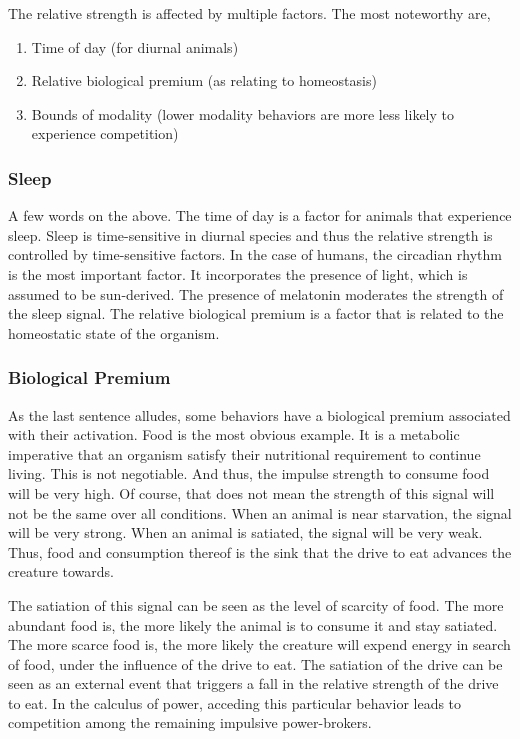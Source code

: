 \documentclass[12pt]{article}
\begin{document}
The relative strength is affected by multiple factors. The most noteworthy are,
\begin{enumerate}
    \item Time of day (for diurnal animals)
    \item Relative biological premium (as relating to homeostasis)
    \item Bounds of modality (lower modality behaviors are more less likely to experience competition)
\end{enumerate}

\subsubsection{Sleep}
A few words on the above.
The time of day is a factor for animals that experience sleep.
Sleep is time-sensitive in diurnal species and thus the relative strength is controlled by time-sensitive factors.
In the case of humans, the circadian rhythm is the most important factor.
It incorporates the presence of light, which is assumed to be sun-derived.
The presence of melatonin moderates the strength of the sleep signal.
The relative biological premium is a factor that is related to the homeostatic state of the organism.

\subsubsection{Biological Premium}
As the last sentence alludes, some behaviors have a biological premium associated with their activation.
Food is the most obvious example.
It is a metabolic imperative that an organism satisfy their nutritional requirement to continue living.
This is not negotiable.
And thus, the impulse strength to consume food will be very high.
Of course, that does not mean the strength of this signal will not be the same over all conditions.
When an animal is near starvation, the signal will be very strong.
When an animal is satiated, the signal will be very weak.
Thus, food and consumption thereof is the sink that the drive to eat advances the creature towards.

The satiation of this signal can be seen as the level of scarcity of food.
The more abundant food is, the more likely the animal is to consume it and stay satiated.
The more scarce food is, the more likely the creature will expend energy in search of food, under the influence of the drive to eat.
The satiation of the drive can be seen as an external event that triggers a fall in the relative strength of the drive to eat.
In the calculus of power, acceding this particular behavior leads to competition among the remaining impulsive power-brokers.
\end{document}
